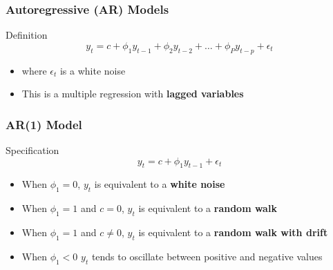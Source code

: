 \documentclass{beamer}
\begin{document}
\begin{frame}
  \frametitle{Autoregressive (AR) Models}

  \begin{block}{Definition}
    \begin{equation*}
      y_t = c + \phi_1 y_{t-1} + \phi_2 y_{t-2} + \dots + \phi_P y_{t-p} + \epsilon_t
    \end{equation*}

    \begin{itemize}
    \item where $\epsilon_t$ is a white noise
    \item This is a multiple regression with \textbf{lagged variables}
    \end{itemize}    
  \end{block}

\end{frame}




\begin{frame}
  \frametitle{AR(1) Model}
  \begin{block}{Specification}
    \begin{equation*}
      y_t = c + \phi_1 y_{t-1} + \epsilon_t
    \end{equation*}
  \end{block}

  \begin{itemize}
  \item When $\phi_1=0$, $y_t$ is equivalent to a \textbf{white noise}
  \item When $\phi_1=1$ and $c=0$, $y_t$ is equivalent to a \textbf{random walk}
  \item When $\phi_1=1$ and $c \neq 0$, $y_t$ is equivalent to a \textbf{random walk with drift}
  \item When $\phi_1<0$ $y_t$ tends to oscillate between positive and negative values 
  \end{itemize}
  
\end{frame}
\end{document}
